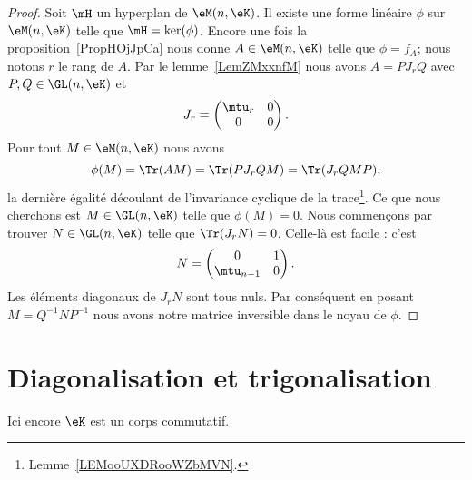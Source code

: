 \begin{proof}
    Soit \( \mH\) un hyperplan de \( \eM(n,\eK)\). Il existe une forme linéaire \( \phi\) sur \( \eM(n,\eK)\) telle que \( \mH=\ker(\phi)\). Encore une fois la proposition~\ref{PropHOjJpCa} nous donne \( A\in \eM(n,\eK)\) telle que \( \phi=f_A\); nous notons \( r\) le rang de \( A\). Par le lemme~\ref{LemZMxxnfM} nous avons \( A=PJ_rQ\) avec \( P,Q\in \GL(n,\eK)\) et
    \begin{equation}
        J_r=\begin{pmatrix}
            \mtu_r  &   0     \\
            0       &   0
        \end{pmatrix}.
    \end{equation}
    Pour tout \( M\in \eM(n,\eK)\) nous avons
    \begin{equation}
        \phi(M)=\Tr(AM)=\Tr(PJ_rQM)=\Tr(J_rQMP),
    \end{equation}
    la dernière égalité découlant de l'invariance cyclique de la trace\footnote{Lemme~\ref{LEMooUXDRooWZbMVN}.}. Ce que nous cherchons est \( M\in \GL(n,\eK)\) telle que \( \phi(M)=0\). Nous commençons par trouver \( N\in\GL(n,\eK)\) telle que \( \Tr(J_rN)=0\). Celle-là est facile : c'est
    \begin{equation}
        N=\begin{pmatrix}
            0           &   1 \\
            \mtu_{n-1}  &   0
        \end{pmatrix}.
    \end{equation}
    Les éléments diagonaux de \( J_rN\) sont tous nuls. Par conséquent en posant \( M=Q^{-1}NP^{-1}\) nous avons notre matrice inversible dans le noyau de \( \phi\).
\end{proof}

\section{Diagonalisation et trigonalisation}

Ici encore \( \eK\) est un corps commutatif.

